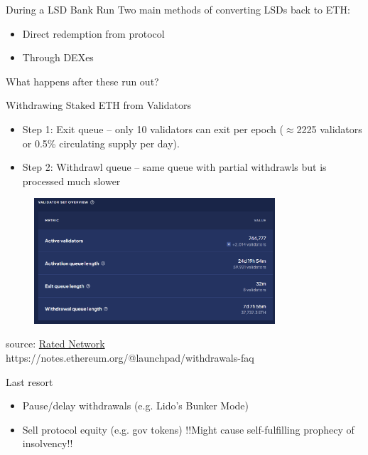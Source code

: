 \documentclass{beamer}
\begin{document}
\begin{frame}{During a LSD Bank Run}
    Two main methods of converting LSDs back to ETH:
    \begin{itemize}
        \item Direct redemption from protocol
        \item Through DEXes
    \end{itemize}
    \bigskip
    What happens after these run out?\\
\end{frame}

\begin{frame}{Withdrawing Staked ETH from Validators}
    \begin{itemize}
        \item Step 1: Exit queue -- only 10 validators can exit per epoch ($\approx$2225 validators or 0.5\% circulating supply per day).
        \item Step 2: Withdrawl queue -- same queue with partial withdrawls but is processed much slower
    \end{itemize}
    \begin{figure}
        \centering
        \includegraphics[width=0.8\textwidth]{figures/rated_queues.png}
    \end{figure}
    \tiny{source: \href{https://www.rated.network/overview?network=mainnet&timeWindow=30d&rewardsMetric=average}{Rated Network}}\\
    https://notes.ethereum.org/@launchpad/withdrawals-faq
\end{frame}

\begin{frame}{Last resort}
    \begin{itemize}
        \item Pause/delay withdrawals (e.g. Lido's Bunker Mode)
        \item Sell protocol equity (e.g. gov tokens) !!Might cause self-fulfilling prophecy of insolvency!!
    \end{itemize}
    
\end{frame}
\end{document}
